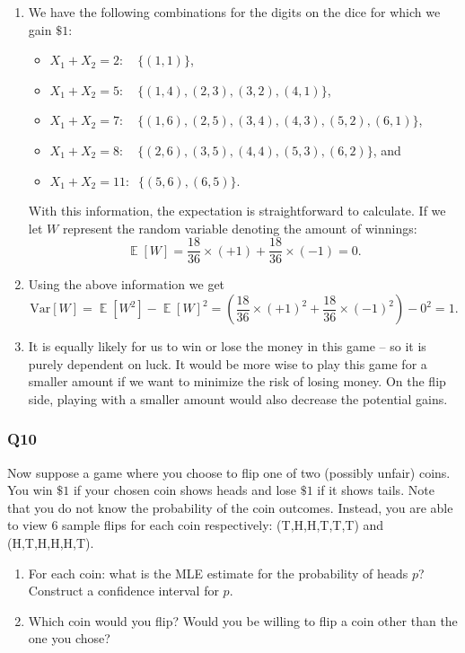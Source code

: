 \documentclass[a4paper, 10pt]{article}
\DeclareMathOperator{\E}{\mathbb{E}}
\begin{document}
\begin{enumerate}
\item We have the following combinations for the digits on the dice for which we gain $\$1$:
  \begin{itemize}
  \item $X_1 + X_2 = 2: \quad \{(1, 1)\}$,
  \item $X_1 + X_2 = 5: \quad\{(1, 4), (2, 3), (3, 2), (4, 1)\}$,
  \item $X_1 + X_2 = 7: \quad\{(1, 6), (2, 5), (3, 4), (4, 3), (5, 2), (6, 1)\}$,
  \item $X_1 + X_2 = 8: \quad\{(2, 6), (3, 5), (4, 4), (5, 3), (6, 2)\}$, and
  \item $X_1 + X_2 = 11: \;\; \{(5, 6), (6, 5)\}$.
  \end{itemize}
  With this information, the expectation is straightforward to calculate. If we let $W$ represent the random variable denoting the amount of winnings:
  \begin{equation*}
    \E[W] = \frac{18}{36} \times (+1) + \frac{18}{36} \times (-1) = 0.
  \end{equation*}

\item Using the above information we get
  \begin{equation*}
    \text{Var}[W] = \E[W^2] - \E[W]^2 = \left(\frac{18}{36} \times (+1)^2 + \frac{18}{36} \times (-1)^2\right) - 0^2 = 1.
  \end{equation*}

\item It is equally likely for us to win or lose the money in this game -- so it is purely dependent on luck. It would be more wise to play this game for a smaller amount if we want to minimize the risk of losing money. On the flip side, playing with a smaller amount would also decrease the potential gains.
  
\end{enumerate}

\subsubsection*{Q10}
Now suppose a game where you choose to flip one of two (possibly unfair) coins. You win $\$1$ if your chosen coin shows heads and lose $\$1$ if it shows tails.
Note that you do not know the probability of the coin outcomes. Instead, you are able to view 6 sample flips for each coin respectively: (T,H,H,T,T,T) and (H,T,H,H,H,T).

\begin{enumerate}
    \item For each coin: what is the MLE estimate for the probability of heads $p$? Construct a confidence interval for $p$.
    \item Which coin would you flip? Would you be willing to flip a coin other than the one you chose?
\end{enumerate}
\end{document}

